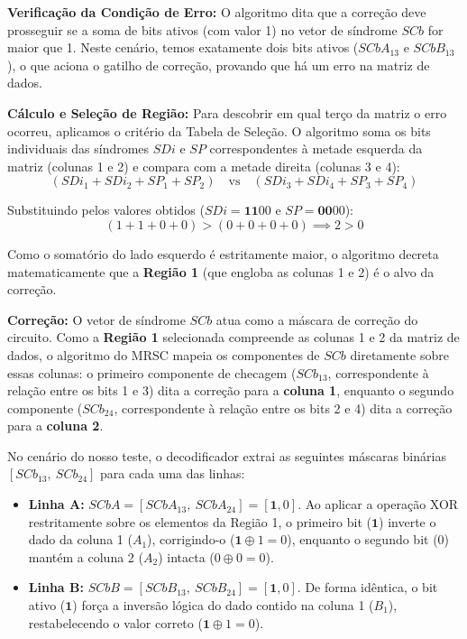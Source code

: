 \documentclass[12pt,a4paper]{article}
\begin{document}
\textbf{Verificação da Condição de Erro:} 
O algoritmo dita que a correção deve prosseguir se a soma de bits ativos (com valor 1) no vetor de síndrome $SCb$ for maior que 1. Neste cenário, temos exatamente dois bits ativos ($SCbA_{13}$ e $SCbB_{13}$), o que aciona o gatilho de correção, provando que há um erro na matriz de dados.

\textbf{Cálculo e Seleção de Região:} 
Para descobrir em qual terço da matriz o erro ocorreu, aplicamos o critério da Tabela de Seleção. O algoritmo soma os bits individuais das síndromes $SDi$ e $SP$ correspondentes à metade esquerda da matriz (colunas 1 e 2) e compara com a metade direita (colunas 3 e 4):
\begin{equation*}
    (SDi_1 + SDi_2 + SP_1 + SP_2) \quad \text{vs} \quad (SDi_3 + SDi_4 + SP_3 + SP_4)
\end{equation*}

Substituindo pelos valores obtidos ($SDi = \mathbf{11}00$ e $SP = \mathbf{00}00$):
\begin{equation*}
    (1 + 1 + 0 + 0) > (0 + 0 + 0 + 0) \implies 2 > 0
\end{equation*}

Como o somatório do lado esquerdo é estritamente maior, o algoritmo decreta matematicamente que a \textbf{Região 1} (que engloba as colunas 1 e 2) é o alvo da correção.

\textbf{Correção:} O vetor de síndrome $SCb$ atua como a máscara de correção do circuito. Como a \textbf{Região 1} selecionada compreende as colunas 1 e 2 da matriz de dados, o algoritmo do MRSC mapeia os componentes de $SCb$ diretamente sobre essas colunas: o primeiro componente de checagem ($SCb_{13}$, correspondente à relação entre os bits 1 e 3) dita a correção para a \textbf{coluna 1}, enquanto o segundo componente ($SCb_{24}$, correspondente à relação entre os bits 2 e 4) dita a correção para a \textbf{coluna 2}.

No cenário do nosso teste, o decodificador extrai as seguintes máscaras binárias $[SCb_{13}, \: SCb_{24}]$ para cada uma das linhas:
\begin{itemize}
    \item \textbf{Linha A:} $SCbA = [SCbA_{13}, \: SCbA_{24}] = [\mathbf{1}, 0]$. Ao aplicar a operação XOR restritamente sobre os elementos da Região 1, o primeiro bit ($\mathbf{1}$) inverte o dado da coluna 1 ($A_1$), corrigindo-o ($\mathbf{1} \oplus 1 = 0$), enquanto o segundo bit ($0$) mantém a coluna 2 ($A_2$) intacta ($0 \oplus 0 = 0$).
    \item \textbf{Linha B:} $SCbB = [SCbB_{13}, \: SCbB_{24}] = [\mathbf{1}, 0]$. De forma idêntica, o bit ativo ($\mathbf{1}$) força a inversão lógica do dado contido na coluna 1 ($B_1$), restabelecendo o valor correto ($\mathbf{1} \oplus 1 = 0$).
\end{itemize}
\end{document}

